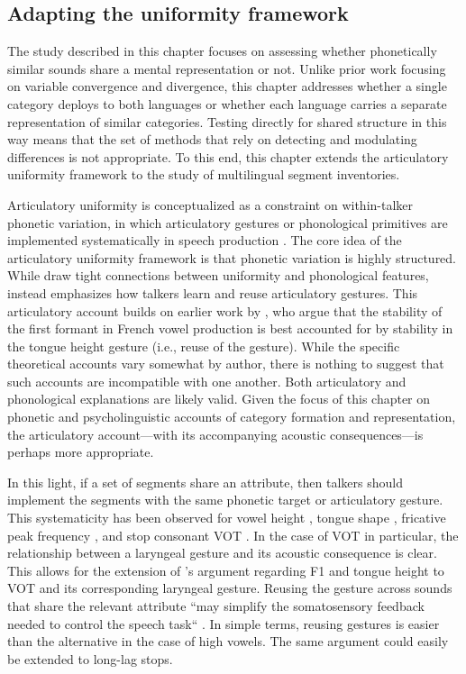 \subsection{Adapting the uniformity framework}\label{ch4:sec:uniformity}

The study described in this chapter focuses on assessing whether phonetically similar sounds share a mental representation or not. Unlike prior work focusing on variable convergence and divergence, this chapter addresses whether a single category deploys to both languages or whether each language carries a separate representation of similar categories. Testing directly for shared structure in this way means that the set of methods that rely on detecting and modulating differences is not appropriate. To this end, this chapter extends the articulatory uniformity framework to the study of multilingual segment inventories. 

Articulatory uniformity is conceptualized as a constraint on within-talker phonetic variation, in which articulatory gestures or phonological primitives are implemented systematically in speech production \citep{chodroff_2017_structure, faytak_2018_uniformity, menard_2008_invariance}. The core idea of the articulatory uniformity framework is that phonetic variation is highly structured. While \citet{chodroff_2017_structure} draw tight connections between uniformity and phonological features, \citet{faytak_2018_uniformity} instead emphasizes how talkers learn and reuse articulatory gestures. This articulatory account builds on earlier work by \citet{menard_2008_invariance}, who argue that the stability of the first formant in French vowel production is best accounted for by stability in the tongue height gesture (i.e., reuse of the gesture). While the specific theoretical accounts vary somewhat by author, there is nothing to suggest that such accounts are incompatible with one another. Both articulatory and phonological explanations are likely valid. Given the focus of this chapter on phonetic and psycholinguistic accounts of category formation and representation, the articulatory account---with its accompanying acoustic consequences---is perhaps more appropriate. 

In this light, if a set of segments share an attribute, then talkers should implement the segments with the same phonetic target or articulatory gesture. This systematicity has been observed for vowel height \citep{menard_2008_invariance}, tongue shape \citep{faytak_2018_uniformity}, fricative peak frequency \citep{chodroff_2017_thesis}, and stop consonant VOT \citep{chodroff_2017_structure}. In the case of VOT in particular, the relationship between a laryngeal gesture and its acoustic consequence is clear. This allows for the extension of \citeauthor{menard_2008_invariance}'s \citeyearpar{menard_2008_invariance} argument regarding F1 and tongue height to VOT and its corresponding laryngeal gesture. Reusing the gesture across sounds that share the relevant attribute ``may simplify the somatosensory feedback needed to control the speech task`` \citep[][p. 26]{menard_2008_invariance}. In simple terms, reusing gestures is easier than the alternative in the case of high vowels. The same argument could easily be extended to long-lag stops. 

